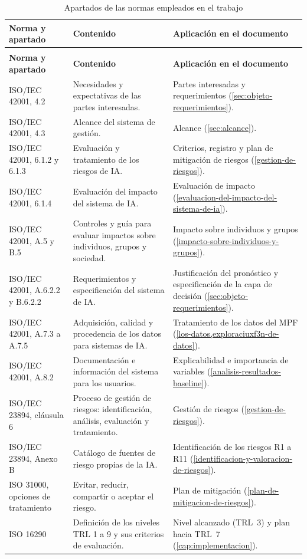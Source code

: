 {\small
\begin{longtable}{@{}>{\raggedright\arraybackslash}p{}
                    >{\raggedright\arraybackslash}p{}
                    >{\raggedright\arraybackslash}p{}@{}}
\caption{Apartados de las normas empleados en el trabajo}
\label{tab:normas-apartados} \\
\toprule
\textbf{Norma y apartado} & \textbf{Contenido} & \textbf{Aplicación en el documento} \\
\midrule
\endfirsthead
\multicolumn{3}{@{}l}{\footnotesize\textit{Tabla \ref{tab:normas-apartados} (continuación)}} \\
\toprule
\textbf{Norma y apartado} & \textbf{Contenido} & \textbf{Aplicación en el documento} \\
\midrule
\endhead
\bottomrule
\endfoot
ISO/IEC 42001, 4.2 & Necesidades y expectativas de las partes interesadas. & Partes interesadas y requerimientos (\cref{sec:objeto-requerimientos}). \\
ISO/IEC 42001, 4.3 & Alcance del sistema de gestión. & Alcance (\cref{sec:alcance}). \\
ISO/IEC 42001, 6.1.2 y 6.1.3 & Evaluación y tratamiento de los riesgos de IA. & Criterios, registro y plan de mitigación de riesgos (\cref{gestion-de-riesgos}). \\
ISO/IEC 42001, 6.1.4 & Evaluación del impacto del sistema de IA. & Evaluación de impacto (\cref{evaluacion-del-impacto-del-sistema-de-ia}). \\
ISO/IEC 42001, A.5 y B.5 & Controles y guía para evaluar impactos sobre individuos, grupos y sociedad. & Impacto sobre individuos y grupos (\cref{impacto-sobre-individuos-y-grupos}). \\
ISO/IEC 42001, A.6.2.2 y B.6.2.2 & Requerimientos y especificación del sistema de IA. & Justificación del pronóstico y especificación de la capa de decisión (\cref{sec:objeto-requerimientos}). \\
ISO/IEC 42001, A.7.3 a A.7.5 & Adquisición, calidad y procedencia de los datos para sistemas de IA. & Tratamiento de los datos del MPF (\cref{los-datos,exploraciuxf3n-de-datos}). \\
ISO/IEC 42001, A.8.2 & Documentación e información del sistema para los usuarios. & Explicabilidad e importancia de variables (\cref{analisis-resultados-baseline}). \\
ISO/IEC 23894, cláusula 6 & Proceso de gestión de riesgos: identificación, análisis, evaluación y tratamiento. & Gestión de riesgos (\cref{gestion-de-riesgos}). \\
ISO/IEC 23894, Anexo B & Catálogo de fuentes de riesgo propias de la IA. & Identificación de los riesgos R1 a R11 (\cref{identificacion-y-valoracion-de-riesgos}). \\
ISO 31000, opciones de tratamiento & Evitar, reducir, compartir o aceptar el riesgo. & Plan de mitigación (\cref{plan-de-mitigacion-de-riesgos}). \\
ISO 16290 & Definición de los niveles TRL 1 a 9 y sus criterios de evaluación. & Nivel alcanzado (TRL~3) y plan hacia TRL~7 (\cref{cap:implementacion}). \\
\end{longtable}
}
